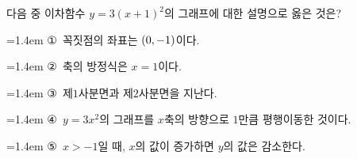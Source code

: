 다음 중 이차함수 $y=3(x+1)^2$의 그래프에 대한 설명으로 옳은 것은?
\par\medskip\par\noindent\hangindent=1.4em {\small ①}\ 꼭짓점의 좌표는 $(0{,}\mkern3mu\mathopen{}-1)$이다.\par\noindent\hangindent=1.4em {\small ②}\ 축의 방정식은 $x=1$이다.\par\noindent\hangindent=1.4em {\small ③}\ 제$1$사분면과 제$2$사분면을 지난다.\par\noindent\hangindent=1.4em {\small ④}\ $y=3x^2$의 그래프를 $x$축의 방향으로 $1$만큼 평행이동한 것이다.\par\noindent\hangindent=1.4em {\small ⑤}\ $x>-1$일 때, $x$의 값이 증가하면 $y$의 값은 감소한다.\par\medskip
